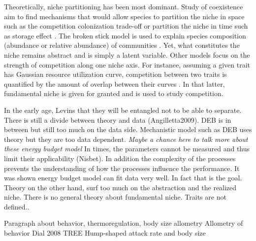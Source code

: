 Theoretically, niche partitioning has been most dominant.
Study of coexistence aim to find mechanisms that would allow species to partition the niche in space such as the competition colonization trade-off \citep[e.g.,][]{Levins1971,Tilman1994} or partition the niche in time such as storage effect \citep{Skellam1951, Chesson2000}. %
The broken stick model is used to explain species composition (abundance or relative abundance) of communities \citep{MacArthur1957}.
Yet, what constitutes the niche remains abstract and is simply a latent variable.
Other models focus on the strength of competition along one niche axis.
For instance, assuming a given trait has Gaussian resource utilization curve, competition  between two traits is quantified by the amount of overlap between their curves \citep{MacArthur1967, Roughgarden1979}.%
In that latter, fundamental niche is given for granted and is used to study competition.

In the early age, Levins that they will be entangled not to be able to separate.
There is still a divide between theory and data (Angilletta2009).
DEB is in between but still too much on the data side.
Mechanistic model such as DEB uses theory but they are too data dependent.
\textit{Maybe a chance here to talk more about these energy budget model}
In times, the parameters cannot be measured and thus limit their applicability (Nisbet).
In addition the complexity of the processes prevents the understanding of how the processes influence the performance.
It was shown energy budget model can fit data very well.
In fact that is the goal.
Theory on the other hand, surf too much on the abstraction and the realized niche.
There is no general theory about fundamental niche.
Traits are not defined..


Paragraph about behavior, thermoregulation, body size allometry
Allometry of behavior Dial 2008 TREE
Hump-shaped attack rate and body size 

